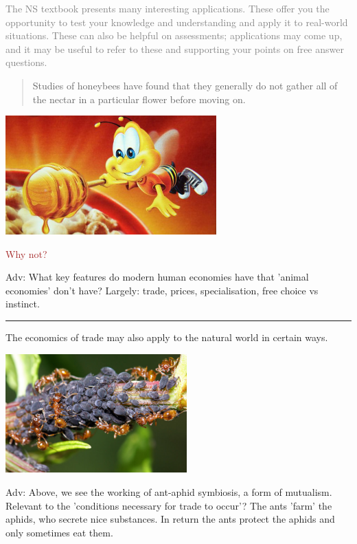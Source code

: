 \documentclass[]{article}
\begin{document}
\textcolor{gray}{The NS textbook presents many interesting applications. These offer you the opportunity to test your knowledge and understanding and apply it to real-world situations. These can also be helpful on assessments; applications may come up, and it may be useful to refer to these and supporting your points on free answer questions.}

\begin{quote}
Studies of honeybees have found that they generally do not gather all of
the nectar in a particular flower before moving on.
\end{quote}

\includegraphics[height=1.8in]{picsfigs/buzbee.jpg}

\textcolor{Brown}{Why not?}

\textcolor{RawSienna}{Adv: What key features do modern human economies have that 'animal economies' don't have? Largely: trade, prices, specialisation, free choice vs instinct.}

\begin{center}\rule{0.5\linewidth}{\linethickness}\end{center}

The economics of trade may also apply to the natural world in certain
ways.

\includegraphics[height=1.8in]{picsfigs/antaphid.jpg}

\textcolor{RawSienna}{Adv: Above, we see the working of ant-aphid symbiosis, a form of mutualism. Relevant to the 'conditions necessary for trade to occur'? The ants 'farm' the aphids, who secrete nice substances. In return the ants protect the aphids and only sometimes eat them.}
\end{document}
